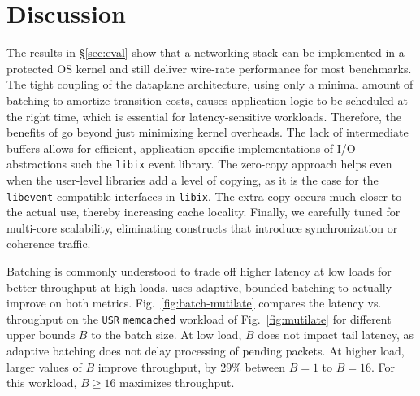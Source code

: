 
\section{Discussion}
\label{sec:disc}


 The results in \S\ref{sec:eval}
show that a networking stack can be implemented in a protected OS
kernel and still deliver wire-rate performance for most benchmarks.
The tight coupling of the dataplane architecture, using only a minimal
amount of batching to amortize transition costs, causes application
logic to be scheduled at the right time, which is essential for
latency-sensitive workloads.  Therefore, the benefits of \ix go beyond
just minimizing kernel overheads. The lack of intermediate buffers
allows for efficient, application-specific implementations of I/O
abstractions such the \texttt{libix} event library. The zero-copy
approach helps even when the user-level libraries add a level of
copying, as it is the case for the \texttt{libevent} compatible
interfaces in \texttt{libix}.  The extra copy occurs much closer to
the actual use, thereby increasing cache locality.  Finally, we
carefully tuned \ix for multi-core scalability, eliminating constructs
that introduce synchronization or coherence traffic. 



 Batching is commonly
understood to trade off higher latency at low loads for better
throughput at high loads.  \ix uses adaptive, bounded batching to
actually improve on both metrics.  Fig.~\ref{fig:batch-mutilate}
compares the latency vs. throughput on the \texttt{USR}
\texttt{memcached} workload of Fig.~\ref{fig:mutilate} for different
upper bounds $B$ to the batch size.  At low load, $B$ does not impact
tail latency, as adaptive batching does not delay processing of
pending packets.  At higher load, larger values of $B$ improve
throughput, by 29\% between $B=1$ to $B=16$.  For this workload, $B
\ge 16$ maximizes throughput.


